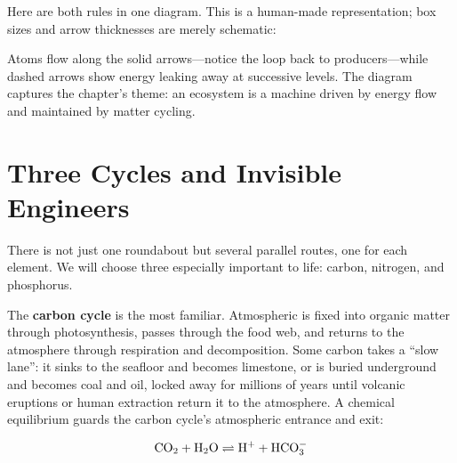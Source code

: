 Here are both rules in one diagram. This is a human-made representation; box sizes and arrow thicknesses are merely schematic:

\begin{center}
\end{center}

Atoms flow along the solid arrows---notice the loop back to producers---while dashed arrows show energy leaking away at successive levels. The diagram captures the chapter's theme: an ecosystem is a machine driven by energy flow and maintained by matter cycling.

\section{Three Cycles and Invisible Engineers}

There is not just one roundabout but several parallel routes, one for each element. We will choose three especially important to life: carbon, nitrogen, and phosphorus.

The \textbf{carbon cycle} is the most familiar. Atmospheric  is fixed into organic matter through photosynthesis, passes through the food web, and returns to the atmosphere through respiration and decomposition. Some carbon takes a ``slow lane'': it sinks to the seafloor and becomes limestone, or is buried underground and becomes coal and oil, locked away for millions of years until volcanic eruptions or human extraction return it to the atmosphere. A chemical equilibrium guards the carbon cycle's atmospheric entrance and exit:

\[\mathrm{CO_2} + \mathrm{H_2O} \rightleftharpoons \mathrm{H^+} + \mathrm{HCO_3^-}\]

